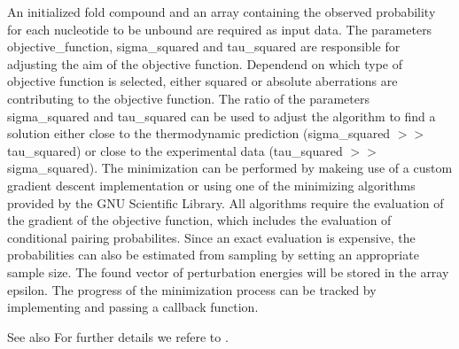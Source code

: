 An initialized fold compound and an array containing the observed probability for each nucleotide to be unbound are required as input data. The parameters objective\+\_\+function, sigma\+\_\+squared and tau\+\_\+squared are responsible for adjusting the aim of the objective function. Dependend on which type of objective function is selected, either squared or absolute aberrations are contributing to the objective function. The ratio of the parameters sigma\+\_\+squared and tau\+\_\+squared can be used to adjust the algorithm to find a solution either close to the thermodynamic prediction (sigma\+\_\+squared $>$$>$ tau\+\_\+squared) or close to the experimental data (tau\+\_\+squared $>$$>$ sigma\+\_\+squared). The minimization can be performed by makeing use of a custom gradient descent implementation or using one of the minimizing algorithms provided by the G\+N\+U Scientific Library. All algorithms require the evaluation of the gradient of the objective function, which includes the evaluation of conditional pairing probabilites. Since an exact evaluation is expensive, the probabilities can also be estimated from sampling by setting an appropriate sample size. The found vector of perturbation energies will be stored in the array epsilon. The progress of the minimization process can be tracked by implementing and passing a callback function.

\begin{DoxySeeAlso}{See also}
For further details we refere to \cite{washietl:2012}.
\end{DoxySeeAlso}

